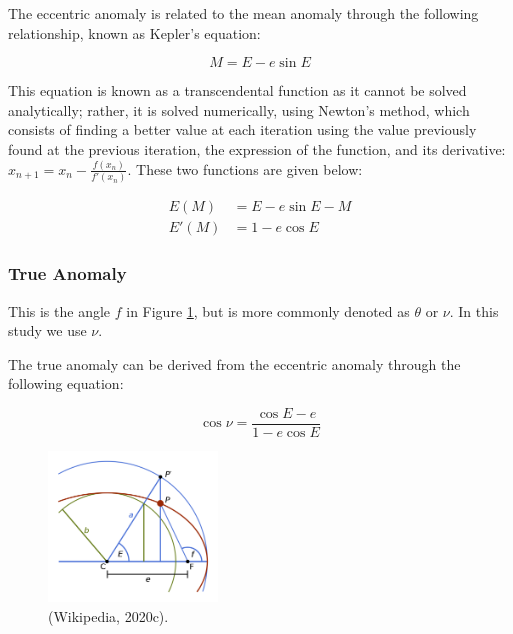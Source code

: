 \documentclass[11pt]{article}
\begin{document}
The eccentric anomaly is related to the mean anomaly through the
following relationship, known as Kepler's equation:

\begin{equation*}
M = E - e\sin{E} 
\end{equation*}

This equation is known as a transcendental function as it cannot be
solved analytically; rather, it is solved numerically, using Newton's method, which consists of finding a better value at each
iteration using the value previously found at the previous iteration,
the expression of the function, and its derivative:
\(x_{n+1} = x_{n}-\frac{f(x_{n})}{f'(x_{n})}\). These two functions are
given below:

\begin{align}
E(M)  & = E - e\sin{E} - M \\
E'(M) & = 1 - e\cos{E}
\end{align}

\vfill

\hypertarget{true-anomaly}{%
\subsubsection{True Anomaly}\label{true-anomaly}}

This is the angle \(f\) in Figure \ref{Figure 2.c}, but is more commonly denoted as
\(\theta\) or \(\nu\). In this study we use \(\nu\).

The true anomaly can be derived from the eccentric anomaly through the following equation:

\begin{equation*}
\cos{\nu} = \frac{ \cos{E} - e }{ 1 - e\cos{E} } 
\end{equation*}


\begin{figure}[!ht]
	\centering
	\includegraphics[width=0.4\textwidth]{../images/Eccentric_and_True_Anomaly.png}
	\caption{(Wikipedia, 2020c).} \label{Figure 2.c}
\end{figure}
\end{document}
